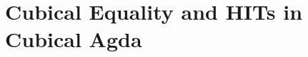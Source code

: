 \documentclass[12pt,twoside,maitrise]{dms}
\theoremstyle{definition}
\numberwithin{equation}{section}
\numberwithin{table}{chapter}
\numberwithin{figure}{chapter}
\newcommand\kw[1] {\textsf{#1}}
\newcommand\id[1] {\texttt{#1}}
\begin{document}





\section{Cubical Equality and HITs in Cubical Agda}\label{sec:cubical-agda}
\end{document}
